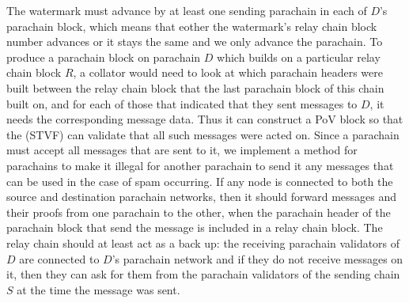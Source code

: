 The watermark must advance by at least one sending parachain in each of $D$'s parachain block, which means that eother the watermark's relay chain block number advances or it stays the same and we only advance the parachain. To produce a parachain block on parachain $D$ which builds on a particular relay chain block $R$, a collator would need to look at which parachain headers were built between the relay chain block that the last parachain block of this chain built on,
and for each of those that indicated that they sent messages to $D$, it needs the corresponding message data.
Thus it can construct a PoV block so that the (STVF) can validate that all such messages were acted on. Since a parachain must accept all messages that are sent to it,
we implement a method for parachains to make it illegal for another parachain to send it any messages that can be used in the case of spam occurring. If any node is connected to both the source and destination parachain networks, then it should forward messages and their proofs from one parachain to the other,
when the parachain header of the parachain block that send the message is included in a relay chain block. The relay chain should at least act as a back up: the receiving parachain validators  of $D$ are connected to $D$'s parachain network and if they do not receive messages on it, then they can ask for them from the parachain validators of the sending chain $S$ at the time the message was sent.

